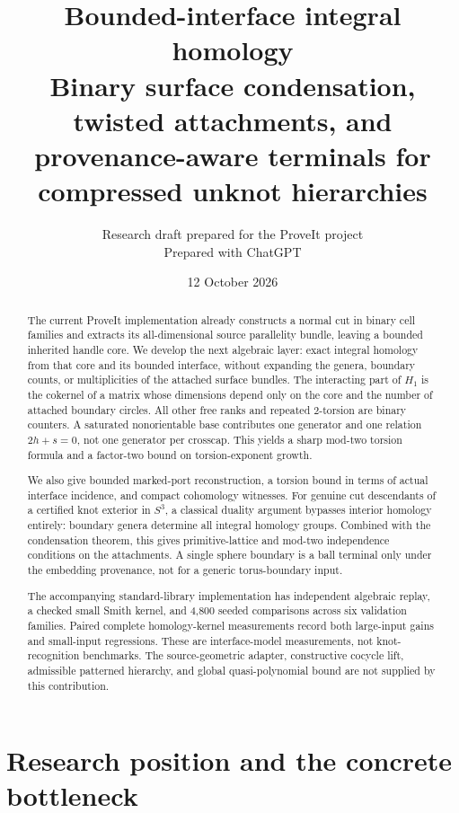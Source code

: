 \documentclass[11pt]{article}
\title{Bounded-interface integral homology\\[5pt]
{\large Binary surface condensation, twisted attachments, and\\
provenance-aware terminals for compressed unknot hierarchies}}
\author{Research draft prepared for the ProveIt project\\\small Prepared with ChatGPT}
\date{12 October 2026}
\theoremstyle{definition}
\theoremstyle{remark}
\begin{document}
\maketitle

\begin{abstract}
The current ProveIt implementation already constructs a normal cut in binary
cell families and extracts its all-dimensional source parallelity bundle,
leaving a bounded inherited handle core. We develop the next algebraic layer:
exact integral homology from that core and its bounded interface, without
expanding the genera, boundary counts, or multiplicities of the attached
surface bundles. The interacting part of $H_1$ is the cokernel of a matrix
whose dimensions depend only on the core and the number of attached boundary
circles. All other free ranks and repeated $2$-torsion are binary counters.
A saturated nonorientable base contributes one generator and one relation
$2h+s=0$, not one generator per crosscap. This yields a sharp mod-two torsion
formula and a factor-two bound on torsion-exponent growth.

We also give bounded marked-port reconstruction, a torsion bound in terms
of actual interface incidence, and compact cohomology witnesses. For genuine
cut descendants of a certified knot exterior in $S^3$, a classical duality
argument bypasses interior homology entirely: boundary genera determine all
integral homology groups. Combined with the condensation theorem, this gives
primitive-lattice and mod-two independence conditions on the attachments.
A single sphere boundary is a ball terminal only under the embedding
provenance, not for a generic torus-boundary input.

The accompanying standard-library implementation has independent algebraic
replay, a checked small Smith kernel, and 4,800 seeded comparisons across six
validation families. Paired complete homology-kernel measurements record
both large-input gains and small-input regressions. These are interface-model
measurements, not knot-recognition benchmarks. The source-geometric adapter,
constructive cocycle lift, admissible patterned hierarchy, and global
quasi-polynomial bound are not supplied by this contribution.
\end{abstract}

\tableofcontents
\newpage

\section{Research position and the concrete bottleneck}
\label{sec:position}
\end{document}
